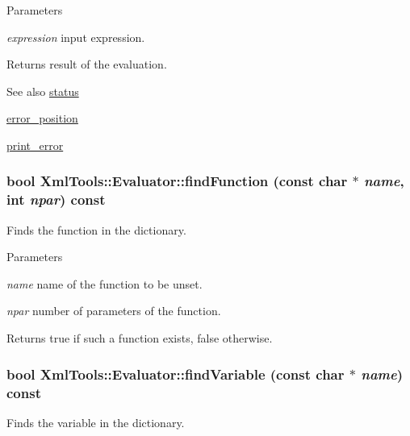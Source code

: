 \begin{DoxyParams}{Parameters}
\item[{\em expression}]input expression. \end{DoxyParams}
\begin{DoxyReturn}{Returns}
result of the evaluation. 
\end{DoxyReturn}
\begin{DoxySeeAlso}{See also}
\hyperlink{class_xml_tools_1_1_evaluator_a2bb48b05d692c7b2f32d7ef8996ef835}{status} 

\hyperlink{class_xml_tools_1_1_evaluator_af036858d3fe40671448306c572e0fd8f}{error\_\-position} 

\hyperlink{class_xml_tools_1_1_evaluator_ad034901d9b832062c7413e698031214e}{print\_\-error} 
\end{DoxySeeAlso}
\hypertarget{class_xml_tools_1_1_evaluator_ab2b36613d2c977346178abbd062ee354}{
\subsubsection[{findFunction}]{\setlength{\rightskip}{0pt plus 5cm}bool XmlTools::Evaluator::findFunction (const char $\ast$ {\em name}, \/  int {\em npar}) const}}
\label{class_xml_tools_1_1_evaluator_ab2b36613d2c977346178abbd062ee354}
Finds the function in the dictionary.


\begin{DoxyParams}{Parameters}
\item[{\em name}]name of the function to be unset. \item[{\em npar}]number of parameters of the function. \end{DoxyParams}
\begin{DoxyReturn}{Returns}
true if such a function exists, false otherwise. 
\end{DoxyReturn}
\hypertarget{class_xml_tools_1_1_evaluator_afc296d1cfdcdb65b93e40b30cf2c2704}{
\subsubsection[{findVariable}]{\setlength{\rightskip}{0pt plus 5cm}bool XmlTools::Evaluator::findVariable (const char $\ast$ {\em name}) const}}
\label{class_xml_tools_1_1_evaluator_afc296d1cfdcdb65b93e40b30cf2c2704}
Finds the variable in the dictionary.


